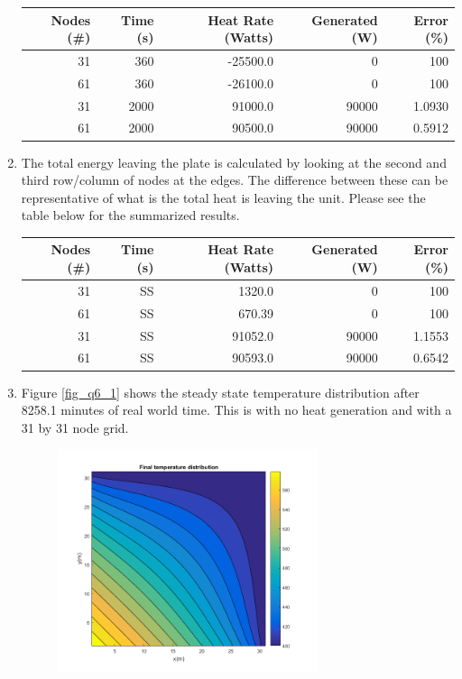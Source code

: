 \begin{enumerate}
\begin{center}
\begin{tabular}{r r r r r}
        \label{table_q4_1}
        Nodes (\#) & Time (s) & Heat Rate (Watts) & Generated (W) & Error (\%) \\ \hline
        31         & 360      & -25500.0       & 0             & 100        \\
        61         & 360      & -26100.0       & 0             & 100        \\
        31         & 2000     & 91000.0        & 90000         & 1.0930     \\
        61         & 2000     & 90500.0        & 90000         & 0.5912     \\
    \end{tabular}
    \end{center}
    \item The total energy leaving the plate is calculated by looking at the second and third row/column of nodes at the edges. The difference between these can be representative of what is the total heat is leaving the unit. Please see the table below for the summarized results.
    \begin{center}
    \begin{tabular}{r r r r r}
        \label{table_q5_1}
        Nodes (\#) & Time (s) & Heat Rate (Watts) & Generated (W) & Error (\%) \\ \hline
        31         & SS       & 1320.0         & 0             & 100        \\
        61         & SS       & 670.39         & 0             & 100        \\
        31         & SS       & 91052.0        & 90000         & 1.1553     \\
        61         & SS       & 90593.0        & 90000         & 0.6542     \\
    \end{tabular}
    \end{center}
    \item Figure \ref{fig_q6_1} shows the steady state temperature distribution after 8258.1 minutes of real world time. This is with no heat generation and with a 31 by 31 node grid.
    \begin{figure}[H]
        \centering
        \includegraphics[width=3in]{pictures/time_SS_31_0.png}

\end{figure}
\end{enumerate}
